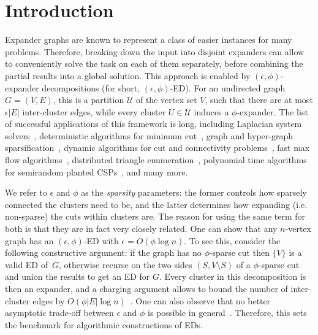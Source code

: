 \documentclass[epsfig,letter,11pt]{article}
\numberwithin{equation}{section}
\begin{document}
\section{Introduction}
Expander graphs are known to represent a class of easier instances for many problems. Therefore, breaking down the input into disjoint expanders can allow to conveniently solve the task on each of them separately, before combining the partial results into a global solution. This approach is enabled by $(\epsilon, \phi)$-expander decompositions (for short, $(\epsilon, \phi)$-ED). For an undirected graph $G=(V,E)$, this is a partition $\mathcal{U}$ of the vertex set $V$, such that there are at most $\epsilon |E|$ inter-cluster edges, while every cluster $U \in \mathcal{U}$ induces a $\phi$-expander. The list of successful applications of this framework is long, including Laplacian system solvers~\cite{stlapl}, deterministic algorithms for minimum cut~\cite{mincutjli}, graph and hyper-graph sparsification~\cite{stspectral, chugao, hgsparse,svapprox}, dynamic algorithms for cut and connectivity problems~\cite{boundlink,sublinearconn}, fast max flow algorithms~\cite{maxflow}, distributed triangle enumeration~\cite{triang}, polynomial time algorithms for semirandom planted CSPs~\cite{csps}, and many more.

We refer to $\epsilon$ and $\phi$ as the \emph{sparsity} parameters: the former controls how sparsely connected the clusters need to be, and the latter determines how expanding (i.e. non-sparse) the cuts within clusters are. The reason for using the same term for both is that they are in fact very closely related. One can show that any $n$-vertex graph has an $(\epsilon,\phi)$-ED with $\epsilon = O(\phi \log n)$. To see this, consider the following constructive argument: if the graph has no $\phi$-sparse cut then $\{V\}$ is a valid ED of~$G$, otherwise recurse on the two sides $(S,V \setminus S)$ of a $\phi$-sparse cut and union the results to get an ED for $G$. Every cluster in this decomposition is then an expander, and a charging argument allows to bound the number of inter-cluster edges by $O(\phi |E| \log n)$~\cite{offlineexpdec}. One can also observe that no better asymptotic trade-off between $\epsilon$ and $\phi$ is possible in general~\cite{clusteringhypercube}. Therefore, this sets the benchmark for algorithmic constructions of EDs.
\end{document}
